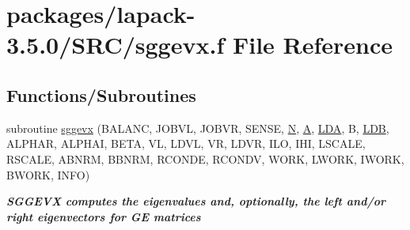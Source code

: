 \hypertarget{sggevx_8f}{}\section{packages/lapack-\/3.5.0/\+S\+R\+C/sggevx.f File Reference}
\label{sggevx_8f}
\subsection*{Functions/\+Subroutines}
\begin{DoxyCompactItemize}
\item 
subroutine \hyperlink{group__realGEeigen_ga47ddf03d427ec3f9346253132c26cf96}{sggevx} (B\+A\+L\+A\+N\+C, J\+O\+B\+V\+L, J\+O\+B\+V\+R, S\+E\+N\+S\+E, \hyperlink{polmisc_8c_a0240ac851181b84ac374872dc5434ee4}{N}, \hyperlink{classA}{A}, \hyperlink{example__user_8c_ae946da542ce0db94dced19b2ecefd1aa}{L\+D\+A}, B, \hyperlink{example__user_8c_a50e90a7104df172b5a89a06c47fcca04}{L\+D\+B}, A\+L\+P\+H\+A\+R, A\+L\+P\+H\+A\+I, B\+E\+T\+A, V\+L, L\+D\+V\+L, V\+R, L\+D\+V\+R, I\+L\+O, I\+H\+I, L\+S\+C\+A\+L\+E, R\+S\+C\+A\+L\+E, A\+B\+N\+R\+M, B\+B\+N\+R\+M, R\+C\+O\+N\+D\+E, R\+C\+O\+N\+D\+V, W\+O\+R\+K, L\+W\+O\+R\+K, I\+W\+O\+R\+K, B\+W\+O\+R\+K, I\+N\+F\+O)
\begin{DoxyCompactList}\small\item\em {\bfseries  S\+G\+G\+E\+V\+X computes the eigenvalues and, optionally, the left and/or right eigenvectors for G\+E matrices} \end{DoxyCompactList}\end{DoxyCompactItemize}
